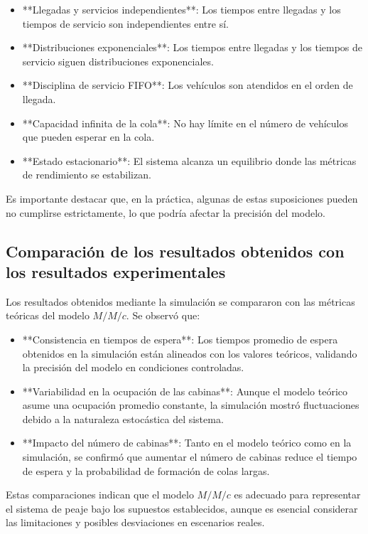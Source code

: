 \documentclass[12pt]{article}
\begin{document}
    \begin{itemize}
        \item **Llegadas y servicios independientes**: Los tiempos entre llegadas y los tiempos de servicio son independientes entre sí.
        \item **Distribuciones exponenciales**: Los tiempos entre llegadas y los tiempos de servicio siguen distribuciones exponenciales.
        \item **Disciplina de servicio FIFO**: Los vehículos son atendidos en el orden de llegada.
        \item **Capacidad infinita de la cola**: No hay límite en el número de vehículos que pueden esperar en la cola.
        \item **Estado estacionario**: El sistema alcanza un equilibrio donde las métricas de rendimiento se estabilizan.
    \end{itemize}
    
    Es importante destacar que, en la práctica, algunas de estas suposiciones pueden no cumplirse estrictamente, lo que podría afectar la precisión del modelo.
    
    \subsection{Comparación de los resultados obtenidos con los resultados experimentales}
    
    Los resultados obtenidos mediante la simulación se compararon con las métricas teóricas del modelo \( M/M/c \). Se observó que:
    
    \begin{itemize}
        \item **Consistencia en tiempos de espera**: Los tiempos promedio de espera obtenidos en la simulación están alineados con los valores teóricos, validando la precisión del modelo en condiciones controladas.
        \item **Variabilidad en la ocupación de las cabinas**: Aunque el modelo teórico asume una ocupación promedio constante, la simulación mostró fluctuaciones debido a la naturaleza estocástica del sistema.
        \item **Impacto del número de cabinas**: Tanto en el modelo teórico como en la simulación, se confirmó que aumentar el número de cabinas reduce el tiempo de espera y la probabilidad de formación de colas largas.
    \end{itemize}
    
    Estas comparaciones indican que el modelo \( M/M/c \) es adecuado para representar el sistema de peaje bajo los supuestos establecidos, aunque es esencial considerar las limitaciones y posibles desviaciones en escenarios reales.
    
\end{document}
